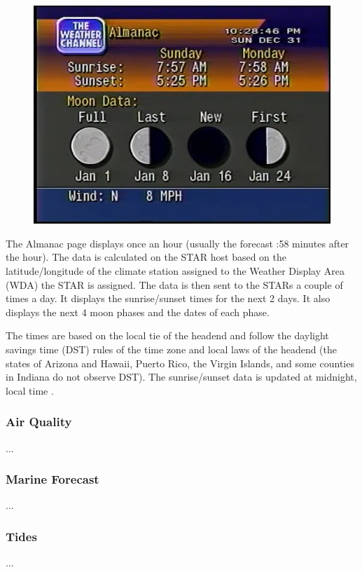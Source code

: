 \documentclass[a4paper,11pt]{refart}
\begin{document}
\begin{figure}[ht!]\centering
\includegraphics[width=\textwidth]{img/almanac.png}
\end{figure}

The Almanac page displays once an hour (usually the forecast :58 minutes after the hour). The data is calculated on the STAR host based on the latitude/longitude of the climate station assigned to the Weather Display Area (WDA) the STAR is assigned. The data is then sent to the STARs a couple of times a day. It displays the sunrise/sunset times for the next 2 days. It also displays the next 4 moon phases and the dates of each phase.

The times are based on the local tie of the headend and follow the daylight savings time (DST) rules of the time zone and local laws of the headend (the states of Arizona and Hawaii, Puerto Rico, the Virgin Islands, and some counties in Indiana do not observe DST). The sunrise/sunset data is updated at midnight, local time \cite{WS4KProdGde}.

\subsubsection*{Air Quality}
...

\subsubsection*{Marine Forecast}
...

\subsubsection*{Tides}
...
\end{document}

